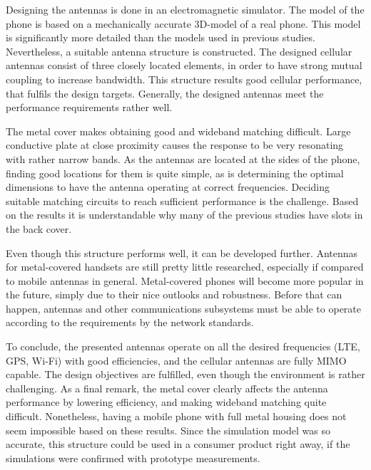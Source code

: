 Designing the antennas is done in an electromagnetic simulator. The model of the phone is based on a mechanically accurate 3D-model of a real phone. This model is significantly more detailed than the models used in previous studies. Nevertheless, a suitable antenna structure is constructed. The designed cellular antennas consist of three closely located elements, in order to have strong mutual coupling to increase bandwidth. This structure results good cellular performance, that fulfils the design targets. Generally, the designed antennas meet the performance requirements rather well.

The metal cover makes obtaining good and wideband matching difficult. Large conductive plate at close proximity causes the response to be very resonating with rather narrow bands. As the antennas are located at the sides of the phone, finding good locations for them is quite simple, as is determining the optimal dimensions to have the antenna operating at correct frequencies. Deciding suitable matching circuits to reach sufficient performance is the challenge. Based on the results it is understandable why many of the previous studies have slots in the back cover.

Even though this structure performs well, it can be developed further. Antennas for metal-covered handsets are still pretty little researched, especially if compared to mobile antennas in general. Metal-covered phones will become more popular in the future, simply due to their nice outlooks and robustness. Before that can happen, antennas and other communications subsystems must be able to operate according to the requirements by the network standards.

To conclude, the presented antennas operate on all the desired frequencies (LTE, GPS, Wi-Fi) with good efficiencies, and the cellular antennas are fully MIMO capable. The design objectives are fulfilled, even though the environment is rather challenging. As a final remark, the metal cover clearly affects the antenna performance by lowering efficiency, and making wideband matching quite difficult. Nonetheless, having a mobile phone with full metal housing does not seem impossible based on these results. Since the simulation model was so accurate, this structure could be used in a consumer product right away, if the simulations were confirmed with prototype measurements.


\clearpage